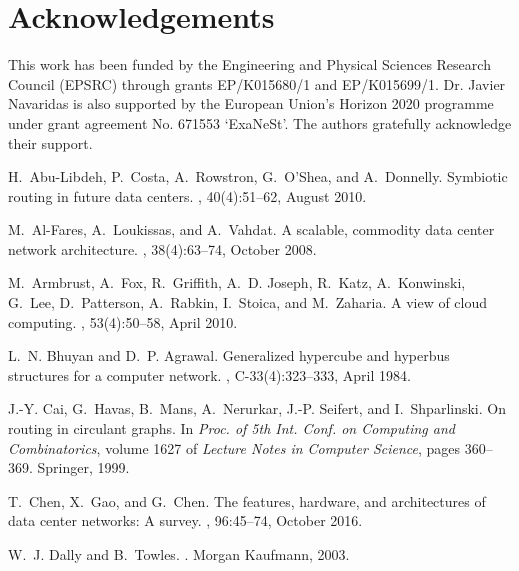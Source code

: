 \documentclass[]{amsart}
\begin{document}
\section*{Acknowledgements }
This work has been funded by the Engineering and Physical Sciences
Research Council (EPSRC) through grants EP/K015680/1 and EP/K015699/1. Dr. Javier Navaridas is also supported by the European Union's Horizon 2020 programme under grant agreement No. 671553 `ExaNeSt'. The authors gratefully acknowledge their support.
 
\FloatBarrier



\begin{thebibliography}{10}

H.~Abu-Libdeh, P.~Costa, A.~Rowstron, G.~O'Shea, and A.~Donnelly.
\newblock Symbiotic routing in future data centers.
, 40(4):51--62, August
  2010.

M.~Al-Fares, A.~Loukissas, and A.~Vahdat.
\newblock A scalable, commodity data center network architecture.
, 38(4):63--74, October
  2008.

M.~Armbrust, A.~Fox, R.~Griffith, A.~D. Joseph, R.~Katz, A.~Konwinski, G.~Lee,
  D.~Patterson, A.~Rabkin, I.~Stoica, and M.~Zaharia.
\newblock A view of cloud computing.
, 53(4):50--58, April 2010.

L.~N. Bhuyan and D.~P. Agrawal.
\newblock Generalized hypercube and hyperbus structures for a computer network.
, C-33(4):323--333, April 1984.

J.-Y. Cai, G.~Havas, B.~Mans, A.~Nerurkar, J.-P. Seifert, and I.~Shparlinski.
\newblock On routing in circulant graphs.
\newblock In {\em Proc. of 5th Int. Conf. on Computing and Combinatorics},
  volume 1627 of {\em Lecture Notes in Computer Science}, pages 360--369.
  Springer, 1999.

T.~Chen, X.~Gao, and G.~Chen.
\newblock The features, hardware, and architectures of data center networks: A
  survey.
, 96:45--74,
  October 2016.

W.~J. Dally and B.~Towles.
.
\newblock Morgan Kaufmann, 2003.


\end{thebibliography}
\end{document}
